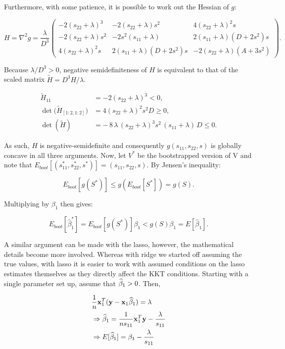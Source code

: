 \noindent Furthermore, with some patience, it is possible to work out the Hessian of $g$:

$$
H = \nabla^{2}g
= \frac{\lambda}{D^{3}}
  \begin{pmatrix}
    -2(s_{22}+\lambda)^{3} & -2(s_{22}+\lambda)s^{2} & 4(s_{22}+\lambda)^{2}s\\[6pt]
    -2(s_{22}+\lambda)s^{2} & -2s^{2}(s_{11}+\lambda) & 2(s_{11}+\lambda)(D+2s^{2})s\\[6pt]
     4(s_{22}+\lambda)^{2}s &  2(s_{11}+\lambda)(D+2s^{2})s & -2(s_{22}+\lambda)(A+3s^{2})
  \end{pmatrix}.
$$

\noindent Because $\lambda/D^{3}>0$, negative semidefiniteness of $H$ is equivalent to that of the scaled matrix $\tilde H = D^{3}H/\lambda$.

$$
\begin{aligned}
\tilde H_{11} &= -2(s_{22}+\lambda)^{3} < 0, \\
\det\bigl(\tilde H_{[1:2,1:2]}\bigr) &= 4(s_{22}+\lambda)^{2}s^{2}D \geq 0, \\
\det(\tilde H) &= -\,8\,\lambda\,(s_{22}+\lambda)^{3}s^{2}\,(s_{11}+\lambda)\,D \leq 0.
\end{aligned}
$$

\noindent As such, $H$ is negative‐semidefinite and consequently $g(s_{11},s_{22},s)$ is globally concave in all three arguments. Now, let $V^*$ be the bootstrapped version of V and note that $E_{boot}[(s_{11}^*, s_{22}^*, s^*)] = (s_{11}, s_{22}, s)$. By Jensen's inequality:

$$
E_{boot}[g(S^*)] \leq g(E_{boot}[S^*]) = g(S).
$$

\noindent Multiplying by $\beta_1$ then gives:

$$
E_{boot}[\hat{\beta}_1^*] = E_{boot}[g(S^*)]\beta_1 < g(S)\beta_1 = E[\hat{\beta}_1].
$$

A similar argument can be made with the lasso, however, the mathematical details become more involved. Whereas with ridge we started off assuming the true values, with lasso it is easier to work with assumed conditions on the lasso estimates themselves as they directly affect the KKT conditions. Starting with a single parameter set up, assume that $\widehat{\beta}_1 > 0$. Then,

$$
\begin{aligned}
&\frac{1}{n}\mathbf{x}_1^T(\mathbf{y} - \mathbf{x}_1 \widehat{\beta}_1) = \lambda \\
&\Rightarrow \widehat{\beta}_1 = \frac{1}{ns_{11}}\mathbf{x}_1^T\mathbf{y} - \frac{\lambda}{s_{11}} \\
&\Rightarrow E[\widehat{\beta}_1] = \beta_1 - \frac{\lambda}{s_{11}} \\
\end{aligned}
$$

